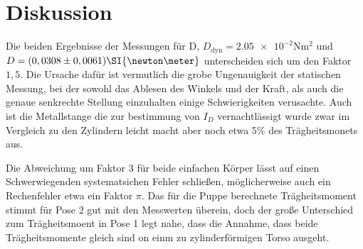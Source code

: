 \section{Diskussion}
\label{sec:Diskussion}

Die beiden Ergebnisse der Messungen für D, $D_{\text{dyn}} =  \num{2,05e-2}\si{\newton\meter\squared}$ und $D = (0,0308 \pm 0,0061)\SI{\newton \meter}$
unterscheiden sich um den Faktor $ 1,5.$ Die Ursache dafür ist vermutlich die grobe Ungenauigkeit der statischen Messung, bei der sowohl das Ablesen des Winkels und der Kraft, als auch die genaue senkrechte Stellung einzuhalten einige Schwierigkeiten verusachte.
Auch ist die Metallstange die zur bestimmung von $I_D$ vernachtlässigt wurde zwar im Vergleich zu den Zylindern leicht macht aber noch etwa 5\% des Trägheitsmonets aus.


Die Abweichung um Faktor $3$ für beide einfachen Körper lässt auf einen Schwerwiegenden systematsichen Fehler schließen,
möglicherweise auch ein Rechenfehler etwa ein Faktor $\pi$.
Das für die Puppe berechnete Trägheitsmoment stimmt für Pose 2 gut mit den Messwerten überein, doch der große Unterschied zum Trägheitsmoent in Pose 1 legt nahe,
dass die Annahme, dass beide Trägheitsmomente gleich sind on einm zu zylinderförmigen Torso ausgeht.
